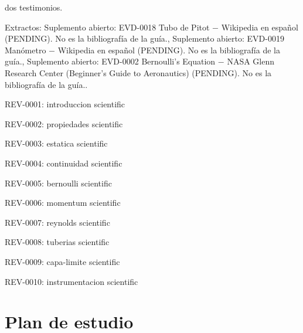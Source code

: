 \documentclass{book}
\begin{document}
\noindent dos testimonios.

\noindent Extractos: Suplemento abierto: EVD-0018 Tubo de Pitot \(-\) Wikipedia en español (PENDING). No es la bibliografía de la guía., Suplemento abierto: EVD-0019 Manómetro \(-\) Wikipedia en español (PENDING). No es la bibliografía de la guía., Suplemento abierto: EVD-0002 Bernoulli's Equation \(-\) NASA Glenn Research Center (Beginner's Guide to Aeronautics) (PENDING). No es la bibliografía de la guía..

\noindent REV-0001: introduccion scientific

\noindent REV-0002: propiedades scientific

\noindent REV-0003: estatica scientific

\noindent REV-0004: continuidad scientific

\noindent REV-0005: bernoulli scientific

\noindent REV-0006: momentum scientific

\noindent REV-0007: reynolds scientific

\noindent REV-0008: tuberias scientific

\noindent REV-0009: capa-limite scientific

\noindent REV-0010: instrumentacion scientific
\chapter{Plan de estudio}
\end{document}
